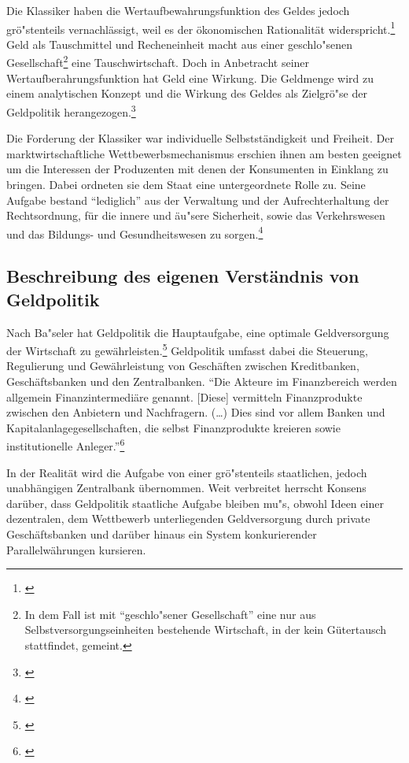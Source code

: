 \documentclass[
        onecolumn,
        a4paper,
        abstracton,
        parskip=half
        ,final
        ]{scrartcl}
\begin{document}
Die Klassiker haben die Wertaufbewahrungsfunktion des Geldes jedoch gr{\"o}{"s}tenteils vernachl{\"a}ssigt, weil es der {\"o}konomischen Rationalit{\"a}t widerspricht.\footnote[17]{\citep*[S.53]{bombach1981theorie}} Geld als Tauschmittel und Recheneinheit macht aus einer geschlo{"s}enen Gesellschaft\footnote[18]{In dem Fall ist mit "`geschlo{"s}ener Gesellschaft"' eine nur aus Selbstversorgungseinheiten bestehende Wirtschaft, in der kein G{\"u}tertausch stattfindet, gemeint.} eine Tauschwirtschaft.
Doch in Anbetracht seiner Wertaufberahrungsfunktion hat Geld eine Wirkung. Die Geldmenge wird zu einem analytischen Konzept und die Wirkung des Geldes als Zielgr{\"o}{"s}e der Geldpolitik herangezogen.\footnote[19]{\citep*[S.421]{Basseler2010}} 
      
Die Forderung der Klassiker war individuelle Selbstst{\"a}ndigkeit und Freiheit. Der marktwirtschaftliche Wettbewerbsmechanismus erschien ihnen am besten geeignet um die Interessen der Produzenten mit denen der Konsumenten in Einklang zu bringen. Dabei ordneten sie dem Staat eine untergeordnete Rolle zu. Seine Aufgabe bestand "`lediglich"' aus der Verwaltung und der Aufrechterhaltung der Rechtsordnung, f{\"u}r die innere und {\"a}u{"s}ere Sicherheit, sowie das Verkehrswesen und das Bildungs- und Gesundheitswesen zu sorgen.\footnote[20]{\citep*[S.60f]{Basseler2010}}
           
           
             


\subsection{Beschreibung des eigenen Verst{\"a}ndnis von Geldpolitik}

Nach Ba{"s}eler hat Geldpolitik die Hauptaufgabe, eine optimale Geldversorgung der Wirtschaft zu gew{\"a}hrleisten.\footnote[21]{\citep*[vgl.][S. 551]{Basseler2010}} Geldpolitik umfasst dabei die Steuerung, Regulierung und Gew{\"a}hrleistung von Gesch{\"a}ften zwischen Kreditbanken, Gesch{\"a}ftsbanken und den Zentralbanken.
 "`Die Akteure im Finanzbereich werden allgemein Finanzintermedi{\"a}re genannt. [Diese] vermitteln Finanzprodukte zwischen den Anbietern und Nachfragern. (\ldots) Dies sind vor allem Banken und Kapitalanlagegesellschaften, die selbst Finanzprodukte kreieren sowie institutionelle Anleger."'\footnote[22]{\citep*[vgl.][S.511f]{Basseler2010}}

In der Realit{\"a}t wird die Aufgabe von einer gr{\"o}{"s}tenteils staatlichen, jedoch unabh{\"a}ngigen Zentralbank {\"u}bernommen. Weit verbreitet herrscht Konsens dar{\"u}ber, dass Geldpolitik staatliche Aufgabe bleiben mu{"s}, obwohl Ideen einer dezentralen, dem Wettbewerb unterliegenden Geldversorgung durch private Gesch{\"a}ftsbanken und dar{\"u}ber hinaus ein System konkurierender Parallelw{\"a}hrungen kursieren.
\end{document}
